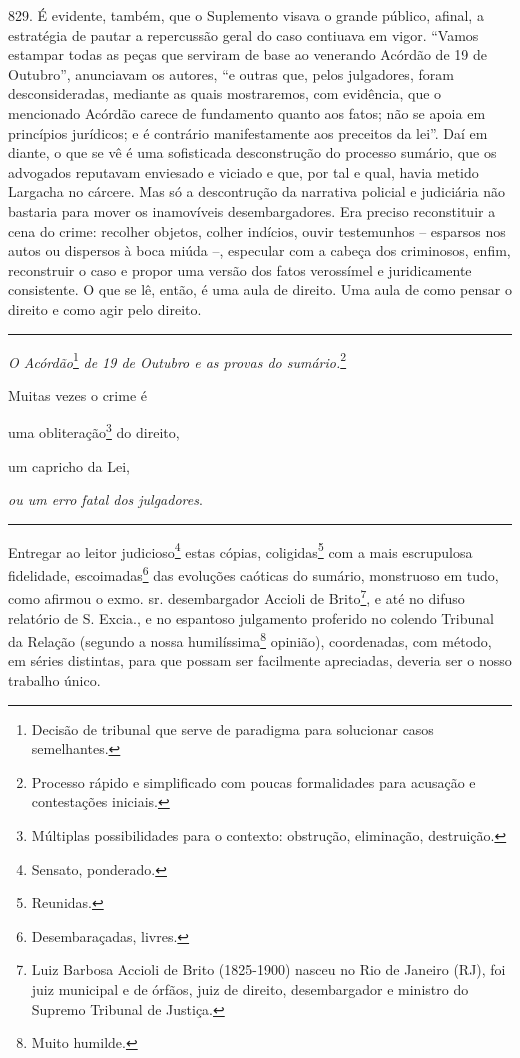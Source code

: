 {829. É evidente, também, que o Suplemento visava o grande público,
afinal, a estratégia de pautar a repercussão geral do caso contiuava em
vigor. ``Vamos estampar todas as peças que serviram de base ao venerando
Acórdão de 19 de Outubro'', anunciavam os autores, ``e outras que, pelos
julgadores, foram desconsideradas, mediante as quais mostraremos, com
evidência, que o mencionado Acórdão carece de fundamento quanto aos
fatos; não se apoia em princípios jurídicos; e é contrário
manifestamente aos preceitos da lei''. Daí em diante, o que se vê é uma
sofisticada desconstrução do processo sumário, que os advogados
reputavam enviesado e viciado e que, por tal e qual, havia metido
Largacha no cárcere. Mas só a descontrução da narrativa policial e
judiciária não bastaria para mover os inamovíveis desembargadores. Era
preciso reconstituir a cena do crime: recolher objetos, colher indícios,
ouvir testemunhos -- esparsos nos autos ou dispersos à boca miúda --,
especular com a cabeça dos criminosos, enfim, reconstruir o caso e
propor uma versão dos fatos verossímel e juridicamente consistente. O
que se lê, então, é uma aula de direito. Uma aula de como pensar o
direito e como agir pelo direito. }

\begin{center}\rule{0.5\linewidth}{\linethickness}\end{center}

\emph{O Acórdão}\footnote{Decisão de tribunal que serve de paradigma
  para solucionar casos semelhantes.} \emph{de 19 de Outubro e as provas
do sumário.}\footnote{Processo rápido e simplificado com poucas
  formalidades para acusação e contestações iniciais.}

Muitas vezes o crime é

uma obliteração\footnote{Múltiplas possibilidades para o contexto:
  obstrução, eliminação, destruição.} do direito,

um capricho da Lei,

\emph{ou um erro fatal dos julgadores}.

\begin{center}\rule{0.5\linewidth}{\linethickness}\end{center}

Entregar ao leitor judicioso\footnote{Sensato, ponderado.} estas cópias,
coligidas\footnote{Reunidas.} com a mais escrupulosa fidelidade,
escoimadas\footnote{Desembaraçadas, livres.} das evoluções caóticas do
sumário, monstruoso em tudo, como afirmou o exmo. sr. desembargador
Accioli de Brito\footnote{Luiz Barbosa Accioli de Brito (1825-1900)
  nasceu no Rio de Janeiro (RJ), foi juiz municipal e de órfãos, juiz de
  direito, desembargador e ministro do Supremo Tribunal de Justiça.}, e
até no difuso relatório de S. Excia., e no espantoso julgamento
proferido no colendo Tribunal da Relação (segundo a nossa
humilíssima\footnote{Muito humilde.} opinião), coordenadas, com método,
em séries distintas, para que possam ser facilmente apreciadas, deveria
ser o nosso trabalho único.

